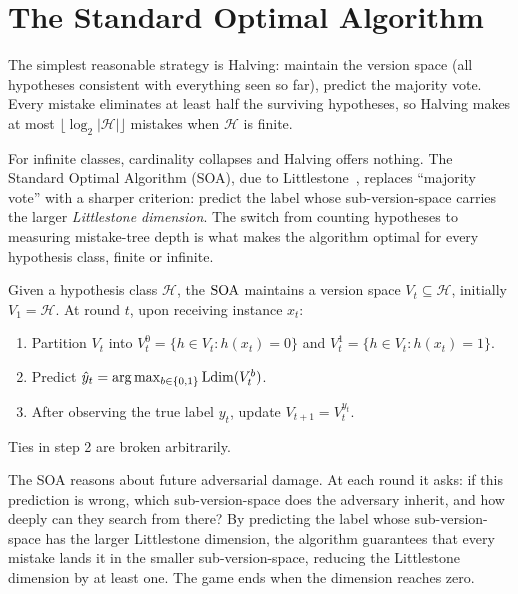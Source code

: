 
\section{The Standard Optimal Algorithm}
\label{sec:soa}

The simplest reasonable strategy is Halving: maintain the version space (all hypotheses consistent with everything seen so far), predict the majority vote. Every mistake eliminates at least half the surviving hypotheses, so Halving makes at most $\lfloor \log_2 |\mathcal{H}| \rfloor$ mistakes when $\mathcal{H}$ is finite.

For infinite classes, cardinality collapses and Halving offers nothing. The Standard Optimal Algorithm (SOA), due to Littlestone~\cite{Littlestone1988}, replaces ``majority vote'' with a sharper criterion: predict the label whose sub-version-space carries the larger \emph{Littlestone dimension}. The switch from counting hypotheses to measuring mistake-tree depth is what makes the algorithm optimal for every hypothesis class, finite or infinite.

\begin{defn}
\label{def:soa}
Given a hypothesis class $\mathcal{H}$, the $\mathrm{SOA}$ maintains a version space $V_t \subseteq \mathcal{H}$, initially $V_1 = \mathcal{H}$. At round $t$, upon receiving instance $x_t$:
\begin{enumerate}[leftmargin=*, itemsep=2pt]
\item Partition $V_t$ into $V_t^0 = \{h \in V_t : h(x_t) = 0\}$ and $V_t^1 = \{h \in V_t : h(x_t) = 1\}$.
\item Predict $\hat{y}_t = \arg\max_{b \in \{0,1\}} \mathrm{Ldim}(V_t^b)$.
\item After observing the true label $y_t$, update $V_{t+1} = V_t^{y_t}$.
\end{enumerate}
Ties in step 2 are broken arbitrarily.
\end{defn}

The SOA reasons about future adversarial damage. At each round it asks: if this prediction is wrong, which sub-version-space does the adversary inherit, and how deeply can they search from there? By predicting the label whose sub-version-space has the larger Littlestone dimension, the algorithm guarantees that every mistake lands it in the smaller sub-version-space, reducing the Littlestone dimension by at least one. The game ends when the dimension reaches zero.

